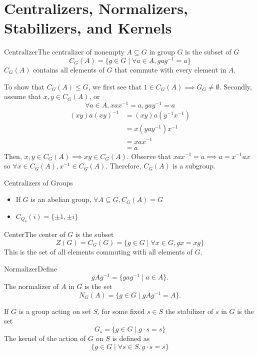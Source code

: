 \documentclass{report}
\newcommand{\ex}[2]{\begin{Example}{#1}{}#2\end{Example}}
\newcommand{\dfn}[2]{\begin{Definition}[colbacktitle=red!75!black]{#1}{}#2\end{Definition}}
\begin{document}
\section{Centralizers, Normalizers, Stabilizers, and Kernels}
\dfn{Centralizer}{The centralizer of nonempty $A\subseteq G$ in group $G$ is the subset of $G$
$$C_G (A) = \{ g \in G \mid \forall a \in A,  gag^{-1} =a\}$$
$C_G(A)$ contains all elements of $G$ that commute with every element in $A$.}
To show that $C_G (A) \leq G$, we first see that $1 \in C_G (A) \implies G_G \neq \emptyset$. Secondly, assume that $x, y \in C_G(A)$, or 
$$\forall a \in A, xax^{-1} = a, yay^{-1} = a$$
\begin{align*}
    (xy)a(xy)^{-1} &= (xy)a(y^{-1} x^{-1}) \\
    &= x(yay^{-1})x^{-1} \\
    &= xax^{-1} \\
    &= a 
\end{align*}
Then, $x, y \in C_G(A) \implies xy \in C_G(A)$. Observe that $xax^{-1} = a \implies  a = x^{-1}ax$ so $\forall x \in C_G(A), x^{-1} \in C_G(A)$. Therefore, $C_G(A)$ is a subgroup. 
\ex{Centralizers of Groups}{\begin{itemize}
    \item If $G$ is an abelian group, $\forall A \subseteq G, C_G(A) = G$
    \item $C_{Q_8} (i) = \{\pm 1, \pm i\}$
\end{itemize}}
\dfn{Center}{The center of $G$ is the subset 
$$Z(G) = C_G(G) = \{ g \in G \mid  \forall x \in G, gx=xg\}$$
This is the set of all elements commuting with all elements of $G$. }
\dfn{Normalizer}{Define 
$$gAg^{-1} = \{gag^{-1} \mid a \in A\}.$$
The normalizer of $A$ in $G$ is the set 
$$N_G(A) =\{g \in G \mid gAg^{-1} = A\}.$$}
If $G$ is a group acting on set $S$, for some fixed $s \in S$ the stabilizer of $s$ in $G$ is the set 
$$G_s = \{g \in G \mid g \cdot s = s \}$$
The kernel of the action of $G$ on $S$ is defined as 
$$\{g \in G \mid \forall s \in S,  g \cdot s = s\}$$
\end{document}
